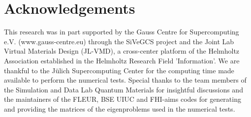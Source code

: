 \documentclass{siamart250211}
\begin{document}











\section*{Acknowledgements}

This research was in part supported by the Gauss Centre for Supercomputing e.V. (www.gauss-centre.eu) through the SiVeGCS project and the Joint Lab Virtual Materials Design (JL-VMD), a cross-center platform of the Helmholtz Association established in the Helmholtz Research Field 'Information'. We are thankful to the J\"ulich Supercomputing Center for the computing time made available to perform the numerical tests. Special thanks to the team members of the Simulation and Data Lab Quantum Materials for insightful discussions and the maintainers of the FLEUR, BSE UIUC and FHI-aims codes for generating and providing the matrices of the eigenproblems used in the numerical tests. 


%



\end{document}
